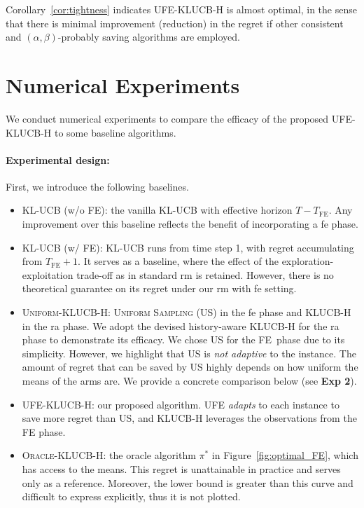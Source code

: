 \documentclass[twoside,11pt]{article}
\newcommand{\yunlong}[1]{{\color{magenta}  [\text{Yunlong:} #1]}}
\newcommand{\Tfe}{T_{\mathrm{FE}}}
\newcommand{\FE}{\textrm{FE}}
\newcommand{\ouralg}{\textsc{UFE-KLUCB-H}}
\newcommand{\ouralgfe}{\textsc{UFE}}
\newcommand{\klucbh}{\textsc{KLUCB-H}}
\begin{document}
Corollary~\ref{cor:tightness} indicates \ouralg{} is almost optimal, in the sense that there is minimal   improvement (reduction) in the regret if other consistent and $(\alpha,\beta)$-probably saving algorithms are employed. 
\section{Numerical Experiments}\label{sec:exp}

We conduct numerical experiments to compare the efficacy of the proposed \ouralg{} to some baseline algorithms. %

\paragraph{Experimental design:}
First, we introduce the following baselines.
\begin{itemize}[leftmargin=*]
    \item \textsc{KL-UCB} (w/o \FE): the vanilla \textsc{KL-UCB} with effective horizon $T-\Tfe$. Any improvement over this baseline reflects the benefit of incorporating a \ac{fe} phase.
    \item \textsc{KL-UCB} (w/ \FE): \textsc{KL-UCB} runs from time step 1, with regret accumulating from $\Tfe+1$. It serves as a baseline, where the effect of the exploration-exploitation trade-off as in standard \ac{rm} is  retained. However, there is no theoretical guarantee on its regret under our \ac{rm} with \ac{fe} setting.
    \item \textsc{Uniform-KLUCB-H}: \textsc{Uniform Sampling (US)} in the \ac{fe} phase and \textsc{KLUCB-H} in the \ac{ra} phase. We adopt the devised history-aware \textsc{KLUCB-H} for the \ac{ra} phase to demonstrate its efficacy. We chose \textsc{US} for the \FE\ phase due to its simplicity. However, we highlight that \textsc{US} is \textit{not adaptive} to the instance. The amount of regret that can be saved by \textsc{US} highly depends on how uniform the means of the arms are. We provide a concrete comparison below (see \textbf{Exp 2}).
    \item \ouralg{}: our proposed algorithm. \ouralgfe{} \textit{adapts} to each instance to save more regret than \textsc{US}, and \klucbh{} leverages the observations from the \FE{} phase.
    \item \textsc{Oracle-KLUCB-H}: the oracle algorithm $\pi^*$ in Figure~\ref{fig:optimal_FE}, which has access to the means. This regret is unattainable in practice and serves only as a reference. Moreover, the lower bound is greater than this curve and difficult to express explicitly, thus it is not plotted.
\end{itemize}
\end{document}
